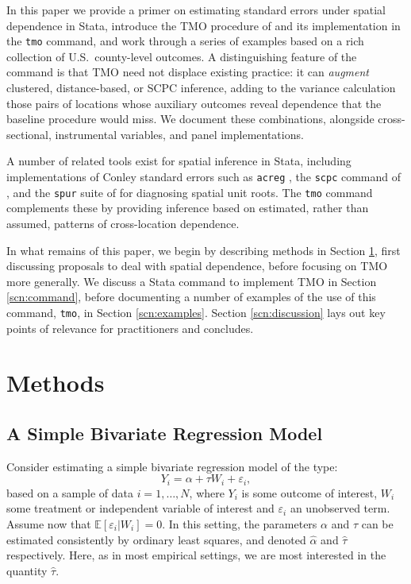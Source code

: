\documentclass[varwidth,bib]{statapress}
\begin{document}
In this paper we provide a primer on estimating standard errors under spatial dependence in Stata, introduce the TMO procedure of \citet{Dellavignaetal2025} and its implementation in the {\tt tmo} command, and work through a series of examples based on a rich collection of U.S.\ county-level outcomes.  A distinguishing feature of the command is that TMO need not displace existing practice: it can \textit{augment} clustered, distance-based, or SCPC inference, adding to the variance calculation those pairs of locations whose auxiliary outcomes reveal dependence that the baseline procedure would miss.  We document these combinations, alongside cross-sectional, instrumental variables, and panel implementations.

A number of related tools exist for spatial inference in Stata, including implementations of Conley standard errors such as {\tt acreg} \citep{Colellaetal2023}, the {\tt scpc} command of \citet{MullerWatson2023}, and the {\tt spur} suite of \citet{Beckeretal2026} for diagnosing spatial unit roots.  The {\tt tmo} command complements these by providing inference based on estimated, rather than assumed, patterns of cross-location dependence.

In what remains of this paper, we begin by describing methods in Section \ref{scn:methods}, first discussing proposals to deal with spatial dependence, before focusing on TMO more generally.  We discuss a Stata command to implement TMO in Section \ref{scn:command}, before documenting a number of examples of the use of this command, {\tt tmo}, in Section \ref{scn:examples}.  Section \ref{scn:discussion} lays out key points of relevance for practitioners and concludes.

\section{Methods}
\label{scn:methods}
\subsection{A Simple Bivariate Regression Model}
Consider estimating a simple bivariate regression model of the type:
\begin{equation}
\label{eqn:linmodel}
Y_{i}=\alpha+\tau W_i + \varepsilon_i,
\end{equation}
based on a sample of data $i=1,\ldots, N$, where $Y_i$ is some outcome of interest, $W_i$ some treatment or independent variable of interest and $\varepsilon_i$ an unobserved term.  Assume now that $\mathbb{E}[\varepsilon_i|W_i]=0$. In this setting, the parameters $\alpha$ and $\tau$ can be estimated consistently by ordinary least squares, and denoted $\widehat\alpha$ and $\widehat\tau$ respectively.  Here, as in most empirical settings, we are most interested in the quantity $\widehat\tau$.
\end{document}
